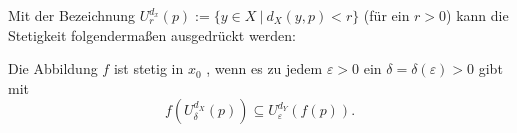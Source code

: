 Mit der Bezeichnung $U^{d_x}_r (p) := \{y \in X \ | \ d_X(y, p) < r \}$ (für ein $r > 0$) kann die Stetigkeit folgendermaßen ausgedrückt werden:

Die Abbildung $f$ ist stetig in $x_0$ , wenn es zu jedem $\varepsilon > 0$ ein $\delta = \delta(\varepsilon) > 0$ gibt mit
$$f(U^{d_X}_\delta(p)) \subseteq U^{d_Y}_\varepsilon(f(p)).$$